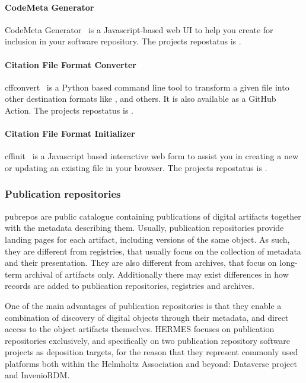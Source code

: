 \documentclass[11pt,a4paper]{scrartcl}
\begin{document}
\paragraph{CodeMeta Generator}\label{par:tooling-codemeta-gen}
CodeMeta Generator~\cite{sw:codemeta-generator} is a Javascript-based web UI to help you create 
 for inclusion in your software repository. The projects
\gls{repostatus} is .

\paragraph{Citation File Format Converter}\label{par:tooling-cffconvert}
cffconvert~\cite{sw:cffconvert} is a Python based command line tool to transform a given 
 file into other destination formats like ,
 and others. It is also available as a GitHub Action.
The projects \gls{repostatus} is .

\paragraph{Citation File Format Initializer}\label{par:tooling-cffinit}
cffinit~\cite{sw:cffinit} is a Javascript based interactive web form to assist you in creating a 
new or updating an existing  file in your browser.
The projects \gls{repostatus} is .



\subsubsection{Publication repositories}\label{subsubsec:repositories}
\Glspl{pubrepo} are public catalogue containing publications of digital artifacts together with the metadata describing them.
Usually, publication repositories provide landing pages for each artifact, including versions of the same object.
As such, they are different from registries, that usually focus on the collection of metadata and their presentation.
They are also different from archives, that focus on long-term archival of artifacts only. Additionally there may exist
differences in how records are added to publication repositories, registries and archives.

One of the main advantages of publication repositories is that they enable a combination of discovery of digital objects
through their metadata, and direct access to the object artifacts themselves. HERMES focuses on publication repositories
exclusively, and specifically on two publication repository software projects as deposition targets, for the reason that
they represent commonly used platforms both within the Helmholtz Association and beyond: Dataverse project and InvenioRDM.
\end{document}
